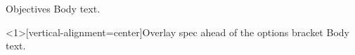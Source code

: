 \documentclass{ltx-talk}
\begin{document}
\begin{frame}[vertical-alignment=center]{Objectives}
Body text.
\end{frame}

\begin{frame}<1>[vertical-alignment=center]{Overlay spec ahead of the options bracket}
Body text.
\end{frame}
\end{document}
